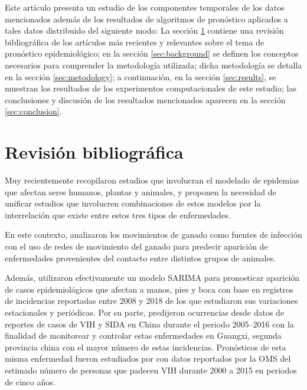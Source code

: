 \documentclass[final,5p,times,twocolumn]{elsarticle}
\begin{document}
Este artículo presenta un estudio de los componentes temporales de los datos mencionados además de los resultados de algoritmos de pronóstico aplicados a tales datos distribuido del siguiente modo: La sección \ref{sec:literature} contiene una revisión bibliográfica de los artículos más recientes y relevantes sobre el tema de pronóstico epidemiológico; en la sección \ref{sec:background} se definen los conceptos necesarios para comprender la metodología utilizada; dicha metodología se detalla en la sección \ref{sec:metodology}; a continuación, en la sección \ref{sec:results}, se muestran los resultados de los experimentos computacionales de este estudio; las conclusiones y discusión de los resultados mencionados aparecen en la sección \ref{sec:conclusion}.

\section{Revisión bibliográfica}
\label{sec:literature}

Muy recientemente \citeauthor{thompsonEA2019} \cite{thompsonEA2019} recopilaron estudios que involucran el modelado de epidemias que afectan seres humanos, plantas y animales, y proponen la necesidad de unificar estudios que involucren combinaciones de estos modelos por la interrelación que existe entre estos tres tipos de enfermedades. 

En este contexto, \citeauthor{chatersEA2019} \cite{chatersEA2019} analizaron los movimientos de ganado como fuentes de infección con el uso de redes de movimiento del ganado para predecir aparición de enfermedades provenientes del contacto entre distintos grupos de animales. 

Además, \citeauthor{tianEA2019} utilizaron efectivamente un modelo SARIMA para pronosticar aparición de casos epidemiológicos que afectan a manos, pies y boca con base en registros de incidencias reportadas entre 2008 y 2018 de los que estudiaron sus variaciones estacionales y periódicas. Por su parte, \citeauthor{wangEA2019} \cite{tianEA2019} predijeron ocurrencias desde datos de reportes de casos de VIH y SIDA en China durante el periodo 2005--2016 con la finalidad de monitorear y controlar estas enfermedades en Guangxi, segunda provincia china con el mayor número de estas incidencias. Pronósticos de esta misma enfermedad fueron estudiados por \citeauthor{xie2019} \cite{xie2019} con datos reportados por la OMS del estimado número de personas que padecen VIH durante 2000 a 2015 en periodos de cinco años.
\end{document}
